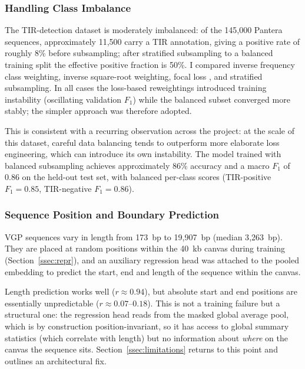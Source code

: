 \documentclass[12pt]{article}
\begin{document}
\subsubsection{Handling Class Imbalance}

The TIR-detection dataset is moderately imbalanced: of the 145{,}000 Pantera sequences, approximately 11{,}500 carry a TIR annotation, giving a positive rate of roughly 8\% before subsampling; after stratified subsampling to a balanced training split the effective positive fraction is 50\%. I compared inverse frequency class weighting, inverse square-root weighting, focal loss \cite{lin2017focal}, and stratified subsampling. In all cases the loss-based reweightings introduced training instability (oscillating validation $F_1$) while the balanced subset converged more stably; the simpler approach was therefore adopted.


This is consistent with a recurring observation across the project: at the scale of this dataset, careful data balancing tends to outperform more elaborate loss engineering, which can introduce its own instability. The model trained with balanced subsampling achieves approximately 86\% accuracy and a macro $F_1$ of 0.86 on the held-out test set, with balanced per-class scores (TIR-positive $F_1 = 0.85$, TIR-negative $F_1 = 0.86$).

\subsubsection{Sequence Position and Boundary Prediction}\label{ssec:tir}

VGP sequences vary in length from 173~bp to 19{,}907~bp (median 3{,}263~bp). They are placed at random positions within the 40~kb canvas during training (Section~\ref{ssec:repr}), and an auxiliary regression head was attached to the pooled embedding to predict the start, end and length of the sequence within the canvas.

Length prediction works well ($r \approx 0.94$), but absolute start and end positions are essentially unpredictable ($r \approx 0.07$--$0.18$). This is not a training failure but a structural one: the regression head reads from the masked global average pool, which is by construction position-invariant, so it has access to global summary statistics (which correlate with length) but no information about \emph{where} on the canvas the sequence sits. Section~\ref{ssec:limitations} returns to this point and outlines an architectural fix.
\end{document}
